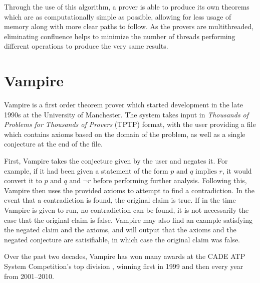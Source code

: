 Through the use of this algorithm, a prover is able to produce its own theorems which are as computationally simple as possible, allowing for less usage of memory along with more clear paths to follow. As the provers are multithreaded, eliminating confluence helps to minimize the number of threads performing different operations to produce the very same results.

\section{Vampire}

Vampire is a first order theorem prover which started development in the late 1990s at the University of Manchester. The system takes input in \textit{Thousands of Problems for Thousands of Provers} (TPTP) format, with the user providing a file which contains axioms based on the domain of the problem, as well as a single conjecture at the end of the file.

First, Vampire takes the conjecture given by the user and negates it. For example, if it had been given a statement of the form $p \text{ and } q \text{ implies } r$, it would convert it to $p \text{ and } q \text{ and } \neg r$ before performing further analysis. Following this, Vampire then uses the provided axioms to attempt to find a contradiction. In the event that a contradiction is found, the original claim is true. If in the time Vampire is given to run, no contradiction can be found, it is not necessarily the case that the original claim is false. Vampire may also find an example satisfying the negated claim and the axioms, and will output that the axioms and the negated conjecture are satisifiable, in which case the original claim was false.

Over the past two decades, Vampire has won many awards at the CADE ATP System Competition's top division \cite{cade}, winning first in 1999 and then every year from 2001--2010.
